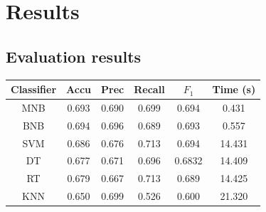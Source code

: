 \documentclass{article} %
\begin{document}
\section{Results}
\subsection{Evaluation results}



\begin{table}[H]
\centering
   \begin{tabular}{@{}|c|c|c|c|c|c|@{}} %
	
   \hline

   Classifier & Accu & Prec & Recall & $F_1$ & Time (s) \\ \hline 
      MNB & 0.693 & 0.690 & 0.699 & 0.694 & 0.431 \\
       BNB & 0.694&  0.696 & 0.689 & 0.693 & 0.557\\
      SVM    &  0.686 & 0.676 & 0.713 & 0.694 & 14.431\\
        DT  &  0.677 & 0.671 & 0.696 & 0.6832 & 14.409 \\
      RT &  0.679 & 0.667 & 0.713 & 0.689 & 14.425  \\
      KNN &  0.650 & 0.699 & 0.526 & 0.600 & 21.320 \\
     \hline
   \end{tabular}
\end{table}
\end{document}
